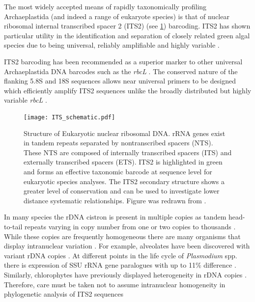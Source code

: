 The most widely accepted means of rapidly taxonomically profiling
Archaeplastida (and indeed a range of eukaryote species) is that of 
nuclear ribosomal internal transcribed spacer 2 (ITS2) (see \cref{fig:its2_schematic}) barcoding. 
ITS2 has shown particular utility in the identification and separation
of closely related green algal species \citep{Buchheim2011,Heeg2015} due to being
universal, reliably amplifiable and highly variable \citep{Hershkovitz1996}.

ITS2 barcoding has been recommended as a superior marker to 
other universal Archaeplastida DNA barcodes such as the \textit{rbcL} 
\citep{Chen2010}.  The conserved nature of the flanking 5.8S and
18S sequences allows near universal primers to be designed which efficiently 
amplify ITS2 sequences unlike the broadly distributed but
highly variable \textit{rbcL} \citep{Buchheim2011}.

\begin{figure}[h]
    \texttt{[image: ITS\_schematic.pdf]}
    \caption[ITS2 structure overview]{Structure of Eukaryotic nuclear ribosomal DNA.
        rRNA genes exist in tandem repeats separated by nontranscribed spacers (NTS).
        These NTS are composed of internally transcribed spacers (ITS) and externally
        transcribed spacers (ETS).
        ITS2 is highlighted in green and forms an effective taxonomic barcode at sequence level 
        for eukaryotic species analyses.  The ITS2 secondary structure
        shows a greater level of conservation and can be used to investigate
        lower distance systematic relationships.  Figure was redrawn from \citep{Shi2005}.}
\label{fig:its2_schematic}
\end{figure}

In many species the rDNA cistron is present in multiple copies
as tandem head-to-tail repeats varying in copy number from one or two copies
to thousands \citep{Torres-Machorro2010}.  While these copies are
frequently homogeneous there are many organisms that display
intranuclear variation \citep{Buchheim2011}.
For example, alveolates have been discovered with variant 
rDNA copies \citep{Stern2012,Galluzzi2004}. At 
different points in the life cycle of \textit{Plasmodium} spp. \citep{Nishimoto2008}
there is expression of SSU rRNA gene paralogues with up to 11\%
difference \citep{McCutchan1988,Chambouvet2015}.
Similarly, chlorophytes have previously displayed 
heterogeneity in rDNA copies \citep{Pillmann1997,Fama2000}.
Therefore, care must be taken not to assume intranuclear
homogeneity in phylogenetic analysis of ITS2 sequences \citep{Buchheim2011}


